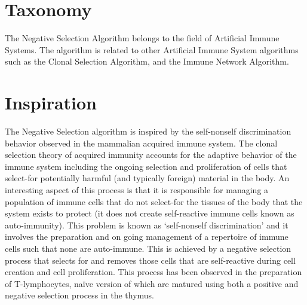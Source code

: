 \documentclass[a4paper, 11pt]{article}
\begin{document}
\section{Taxonomy}
\label{sec:taxonomy}
The Negative Selection Algorithm belongs to the field of Artificial Immune Systems.
The algorithm is related to other Artificial Immune System algorithms such as the Clonal Selection Algorithm, and the Immune Network Algorithm.

\section{Inspiration}
\label{sec:inspiration}
The Negative Selection algorithm is inspired by the self-nonself discrimination behavior observed in the mammalian acquired immune system.
The clonal selection theory of acquired immunity accounts for the adaptive behavior of the immune system including the ongoing selection and proliferation of cells that select-for potentially harmful (and typically foreign) material in the body.
An interesting aspect of this process is that it is responsible for managing a population of immune cells that do not select-for the tissues of the body that the system exists to protect (it does not create self-reactive immune cells known as auto-immunity). 
This problem is known as `self-nonself discrimination' and it involves the preparation and on going management of a repertoire of immune cells such that none are auto-immune. This is achieved by a negative selection process that selects for and removes those cells that are self-reactive during cell creation and cell proliferation. This process has been observed in the preparation of T-lymphocytes, na\"ive version of which are matured using both a positive and negative selection process in the thymus.
\end{document}
